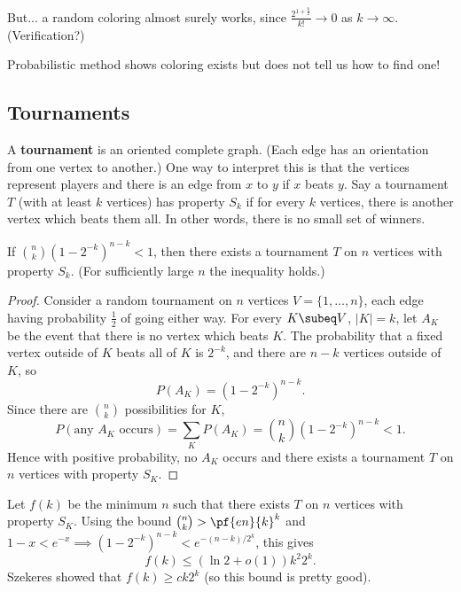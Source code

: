 But... a random coloring almost surely works, since $\frac{2^{1+\frac k2}}{k!}\to 0$ as $k\to \infty$. (Verification?)

Probabilistic method shows coloring exists but does not tell us how to find one!

\subsection{Tournaments}
\begin{df}
A \textbf{tournament} is an oriented complete graph. (Each edge has an orientation from one vertex to another.) One way to interpret this is that the vertices represent players and there is an edge from $x$ to $y$ if $x$ beats $y$. 
Say a tournament $T$ (with at least $k$ vertices) has property $S_k$ if for every $k$ vertices, there is another vertex which beats them all. In other words, there is no small set of winners.
\end{df}
\begin{thm}[Erd\"os] If $\binom nk (1-2^{-k})^{n-k}<1$, then there exists a tournament $T$ on $n$ vertices with property $S_k$. (For sufficiently large $n$ the inequality holds.)
\end{thm}
\begin{proof}
Consider a random tournament on $n$ vertices $V=\{1,\ldots, n\}$, each edge having probability $\frac 12$ of going either way.  For every $K\subeq V$, $|K|=k$, let $A_K$ be the event that there is no vertex which beats $K$.
The probability that a fixed vertex outside of $K$ beats all of $K$ is $2^{-k}$, and there are $n-k$ vertices outside of $K$, so
\[P(A_K)=(1-2^{-k})^{n-k}.\]
Since there are $\binom nk$ possibilities for $K$,
\[P(\text{any }A_K \text{ occurs})=\sum_K P(A_K)=\binom nk(1-2^{-k})^{n-k}<1.\]
Hence with positive probability, no $A_K$ occurs and there exists a tournament $T$ on $n$ vertices with property $S_K$. 
\end{proof}
Let $f(k)$ be the minimum $n$ such that there exists $T$ on $n$ vertices with property $S_K$. Using the bound $\binom nk>\pf{en}{k}^k$ and $1-x<e^{-x}\implies (1-2^{-k})^{n-k}<e^{-(n-k)/2^k}$, this gives
\[f(k)\leq (\ln 2+o(1))k^2 2^k.\]
Szekeres showed that $f(k)\geq ck2^k$ (so this bound is pretty good).
